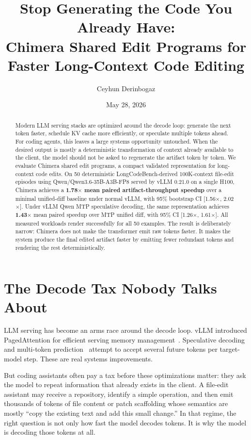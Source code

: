 \documentclass[10pt,twocolumn]{article}
\title{\vspace{-0.35in}\bfseries Stop Generating the Code You Already Have:\\
\large Chimera Shared Edit Programs for Faster Long-Context Code Editing}
\author{
Ceyhun Derinbogaz
}
\date{May 28, 2026}
\newcommand{\method}{Chimera}
\begin{document}
\maketitle

\begin{abstract}
Modern LLM serving stacks are optimized around the decode loop: generate the
next token faster, schedule KV cache more efficiently, or speculate multiple
tokens ahead. For coding agents, this leaves a large systems opportunity
untouched. When the desired output is mostly a deterministic transformation of
context already available to the client, the model should not be asked to
regenerate the artifact token by token. We evaluate \method{} shared edit
programs, a compact validated representation for long-context code edits. On
50 deterministic LongCodeBench-derived 100K-context file-edit episodes using
Qwen/Qwen3.6-35B-A3B-FP8 served by vLLM 0.21.0 on a single H100, \method{}
achieves a \textbf{1.78$\times$ mean paired artifact-throughput speedup} over a
minimal unified-diff baseline under normal vLLM, with 95\% bootstrap CI
[1.56$\times$, 2.02$\times$]. Under vLLM Qwen MTP speculative decoding, the
same representation achieves \textbf{1.43$\times$} mean paired speedup over MTP
unified diff, with 95\% CI [1.26$\times$, 1.61$\times$]. All measured workloads
render successfully for all 50 examples. The result is deliberately narrow:
\method{} does not make the transformer emit raw tokens faster. It makes the
system produce the final edited artifact faster by emitting fewer redundant
tokens and rendering the rest deterministically.
\end{abstract}

\section{The Decode Tax Nobody Talks About}

LLM serving has become an arms race around the decode loop. vLLM introduced
PagedAttention for efficient serving memory management~\citep{kwon2023pagedattention}.
Speculative decoding~\citep{leviathan2023speculative} and multi-token
prediction~\citep{gloeckle2024mtp} attempt to accept several future tokens per
target-model step. These are real systems improvements.

But coding assistants often pay a tax before these optimizations matter: they
ask the model to repeat information that already exists in the client. A
file-edit assistant may receive a repository, identify a simple operation, and
then emit thousands of tokens of file content or patch scaffolding whose
semantics are mostly ``copy the existing text and add this small change.'' In
that regime, the right question is not only how fast the model decodes tokens.
It is why the model is decoding those tokens at all.
\end{document}
